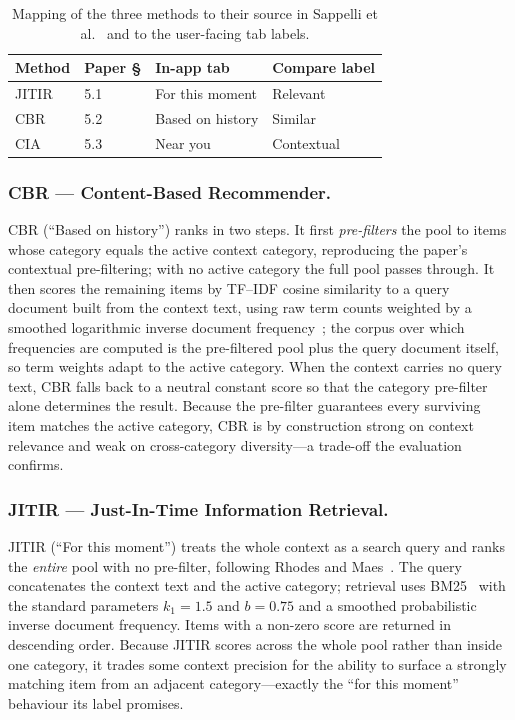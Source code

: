 \documentclass[acmlarge]{acmart}
\begin{document}
\begin{table}[t]
  \caption{Mapping of the three methods to their source in
  Sappelli et al.~\cite{sappelli2017} and to the user-facing tab labels.}
  \label{tab:method-map}
  \begin{tabular}{llll}
    \toprule
    Method & Paper \S & In-app tab & Compare label \\
    \midrule
    JITIR & 5.1 & For this moment & Relevant \\
    CBR   & 5.2 & Based on history & Similar \\
    CIA   & 5.3 & Near you & Contextual \\
    \bottomrule
  \end{tabular}
\end{table}

\subsubsection{CBR --- Content-Based Recommender.}
CBR (``Based on history'') ranks in two steps. It first
\emph{pre-filters} the pool to items whose category equals the active
context category, reproducing the paper's contextual pre-filtering; with no
active category the full pool passes through. It then scores the remaining
items by TF--IDF cosine similarity to a query document built from the
context text, using raw term counts weighted by a smoothed logarithmic
inverse document frequency~\cite{salton1988tfidf}; the corpus over which
frequencies are computed is the pre-filtered pool plus the query document
itself, so term weights adapt to the active category.
When the context carries no query text, CBR falls back to a neutral
constant score so that the category pre-filter alone determines the
result. Because the pre-filter guarantees every surviving item matches the
active category, CBR is by construction strong on context relevance and
weak on cross-category diversity---a trade-off the evaluation confirms.

\subsubsection{JITIR --- Just-In-Time Information Retrieval.}
JITIR (``For this moment'') treats the whole context as a search query and
ranks the \emph{entire} pool with no pre-filter, following Rhodes and
Maes~\cite{rhodes2000jitir}. The query concatenates the context text and
the active category; retrieval uses BM25~\cite{robertson2009bm25} with the
standard parameters $k_1=1.5$ and $b=0.75$ and a smoothed probabilistic
inverse document frequency. Items with a non-zero score are returned in
descending order. Because JITIR scores across the whole pool rather than
inside one category, it trades some context precision for the ability to
surface a strongly matching item from an adjacent category---exactly the
``for this moment'' behaviour its label promises.
\end{document}
